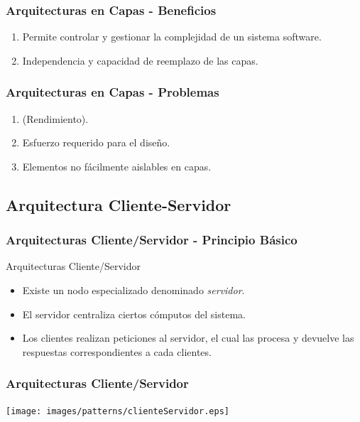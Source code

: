 \documentclass[handout,a4paper,t,xcolor=pst,dvips,colortheme]{beamer}
\begin{document}
\begin{frame}[c]
    \frametitle{Arquitecturas en Capas - Beneficios}
    \begin{enumerate}[<+->]
        \item Permite controlar y gestionar la complejidad de un sistema software.
        \item Independencia y capacidad de reemplazo de las capas.
    \end{enumerate}
\end{frame}

\begin{frame}[c]
    \frametitle{Arquitecturas en Capas - Problemas}
    \begin{enumerate}[<+->]
        \item (Rendimiento).
        \item Esfuerzo requerido para el diseño.
        \item Elementos no fácilmente aislables en capas.
    \end{enumerate}
\end{frame}

\subsection{Arquitectura Cliente-Servidor}

\begin{frame}[c]
    \frametitle{Arquitecturas Cliente/Servidor - Principio Básico}
    \begin{block}{Arquitecturas Cliente/Servidor}
        \begin{itemize}[<+->]
            \item Existe un nodo especializado denominado \emph{servidor}.
            \item El servidor centraliza ciertos cómputos del sistema.
            \item Los clientes realizan peticiones al servidor, el cual las procesa y devuelve las respuestas correspondientes a cada clientes.
        \end{itemize}
    \end{block}
\end{frame}

\begin{frame}[c]
	\frametitle{Arquitecturas Cliente/Servidor}
	\begin{center}
        \texttt{[image: images/patterns/clienteServidor.eps]}
	\end{center}
\end{frame}
\end{document}

